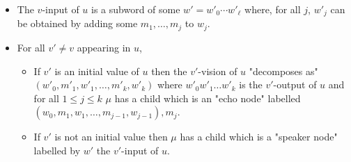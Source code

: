 \begin{definition}
\begin{itemize}
		\item The $v$-input of $u$ is a subword of some $w' = w'_0\cdots w'_\ell$ where, for all $j$, $w'_j$ can be obtained by adding some $m_1, \ldots, m_{j}$ to $w_j$.
		
		\item For all $v' \neq v$ appearing in $u$,
		\begin{itemize}
			\item If $v'$ is an initial value of $u$ then the $v'$-vision of $u$ "decomposes as"  $(w'_0, m'_1, w'_1, \ldots, m'_k, w'_k)$ where $w'_0 w'_1 \ldots w'_k$ is the $v'$-output of $u$ and for all $1 \leq j \leq k$ $\mu$ has a child which is an "echo node" labelled $(w_0, m_1, w_1, \ldots, m_{j-1}, w_{j-1}), m_j$.  
			
			\item If $v'$ is not an initial value then $\mu$ has a child which is a "speaker node" labelled by $w'$ the $v'$-input of $u$.
		\end{itemize}
	\end{itemize}
\end{definition}



%	
%		

